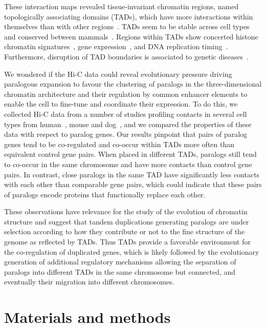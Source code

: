 \documentclass[a4paper,twoside=true,openright,parskip=full,chapterprefix=true,11pt,headings=normal,bibliography=totoc,listof=totoc,titlepage=on,captions=tableabove,draft=false]{scrreprt}
\theoremstyle{definition}
\theoremstyle{definition}
\theoremstyle{definition}
\theoremstyle{remark}
\begin{document}
These interaction maps revealed tissue-invariant chromatin regions,
named topologically associating domains (TADs), which have more
interactions within themselves than with other
regions~\citep{Dixon2012, Nora2012, Sexton2012}. TADs seem to be stable
across cell types and conserved between
mammals~\citep{Dixon2012, Rao2014, VietriRudan2015}. Regions within TADs
show concerted histone chromatin
signatures~\citep{Dixon2012, Sexton2012}, gene
expression~\citep{LeDily2014, Nora2012}, and DNA replication
timing~\citep{Pope2014}. Furthermore, disruption of TAD boundaries is
associated to genetic diseases~\citep{Ibn-Salem2014, Lupianez2015}.

We wondered if the Hi-C data could reveal evolutionary pressure driving
paralogous expansion to favour the clustering of paralogs in the
three-dimensional chromatin architecture and their regulation by common
enhancer elements to enable the cell to fine-tune and coordinate their
expression. To do this, we collected Hi-C data from a number of studies
profiling contacts in several cell types from
human~\citep{Dixon2012, Rao2014}, mouse and dog~\citep{VietriRudan2015},
and we compared the properties of these data with respect to paralog
genes. Our results pinpoint that pairs of paralog genes tend to be
co-regulated and co-occur within TADs more often than equivalent control
gene pairs. When placed in different TADs, paralogs still tend to
co-occur in the same chromosome and have more contacts than control gene
pairs. In contrast, close paralogs in the same TAD have significantly
less contacts with each other than comparable gene pairs, which could
indicate that these pairs of paralogs encode proteins that functionally
replace each other.

These observations have relevance for the study of the evolution of
chromatin structure and suggest that tandem duplications generating
paralogs are under selection according to how they contribute or not to
the fine structure of the genome as reflected by TADs. Thus TADs provide
a favorable environment for the co-regulation of duplicated genes, which
is likely followed by the evolutionary generation of additional
regulatory mechanisms allowing the separation of paralogs into different
TADs in the same chromosome but connected, and eventually their
migration into different chromosomes.

\hypertarget{sec:paralog-methods}{%
\section{Materials and methods}\label{sec:paralog-methods}}
\end{document}
